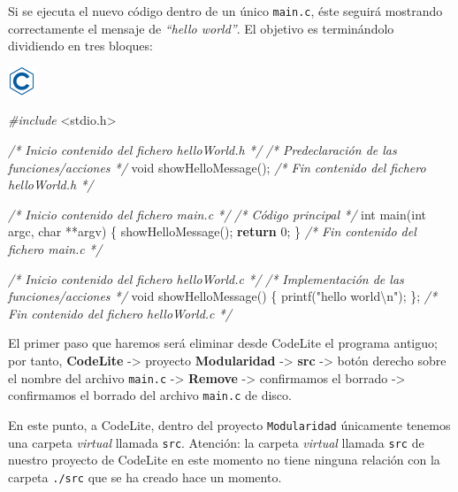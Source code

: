\documentclass[
]{book}
\newenvironment{Shaded}{\begin{snugshade}}{\end{snugshade}}
\newcommand{\CommentTok}[1]{\textcolor[rgb]{0.56,0.35,0.01}{\textit{#1}}}
\newcommand{\ControlFlowTok}[1]{\textcolor[rgb]{0.13,0.29,0.53}{\textbf{#1}}}
\newcommand{\DataTypeTok}[1]{\textcolor[rgb]{0.13,0.29,0.53}{#1}}
\newcommand{\DecValTok}[1]{\textcolor[rgb]{0.00,0.00,0.81}{#1}}
\newcommand{\ImportTok}[1]{#1}
\newcommand{\NormalTok}[1]{#1}
\newcommand{\PreprocessorTok}[1]{\textcolor[rgb]{0.56,0.35,0.01}{\textit{#1}}}
\newcommand{\SpecialCharTok}[1]{\textcolor[rgb]{0.00,0.00,0.00}{#1}}
\newcommand{\StringTok}[1]{\textcolor[rgb]{0.31,0.60,0.02}{#1}}
\begin{document}
Si se ejecuta el nuevo código dentro de un único \texttt{main.c}, éste seguirá mostrando correctamente el mensaje de \emph{``hello world''}. El objetivo es terminándolo dividiendo en tres bloques:

\includegraphics{./img/c.png}

\begin{Shaded}
\begin{Highlighting}[]
\PreprocessorTok{\#include }\ImportTok{\textless{}stdio.h\textgreater{}}

\CommentTok{/* Inicio contenido del fichero helloWorld.h */}
\CommentTok{/* Predeclaración de las funciones/acciones */}
\DataTypeTok{void}\NormalTok{ showHelloMessage();}
\CommentTok{/* Fin contenido del fichero helloWorld.h */}

\CommentTok{/* Inicio contenido del fichero main.c */}
\CommentTok{/* Código principal */}
\DataTypeTok{int}\NormalTok{ main(}\DataTypeTok{int}\NormalTok{ argc, }\DataTypeTok{char}\NormalTok{ **argv) \{}
\NormalTok{    showHelloMessage();}
    \ControlFlowTok{return} \DecValTok{0}\NormalTok{;}
\NormalTok{\}}
\CommentTok{/* Fin contenido del fichero main.c */}

\CommentTok{/* Inicio contenido del fichero helloWorld.c */}
\CommentTok{/* Implementación de las funciones/acciones */}
\DataTypeTok{void}\NormalTok{ showHelloMessage() \{}
\NormalTok{    printf(}\StringTok{"hello world}\SpecialCharTok{\textbackslash{}n}\StringTok{"}\NormalTok{);}
\NormalTok{\};}
\CommentTok{/* Fin contenido del fichero helloWorld.c */}
\end{Highlighting}
\end{Shaded}

El primer paso que haremos será eliminar desde CodeLite el programa antiguo; por tanto, \textbf{CodeLite} -\textgreater{} proyecto \textbf{Modularidad} -\textgreater{} \textbf{src} -\textgreater{} botón derecho sobre el nombre del archivo \texttt{main.c} -\textgreater{} \textbf{Remove} -\textgreater{} confirmamos el borrado -\textgreater{} confirmamos el borrado del archivo \texttt{main.c} de disco.

En este punto, a CodeLite, dentro del proyecto \texttt{Modularidad} únicamente tenemos una carpeta \emph{virtual} llamada \texttt{src}. Atención: la carpeta \emph{virtual} llamada \texttt{src} de nuestro proyecto de CodeLite en este momento no tiene ninguna relación con la carpeta \texttt{./src} que se ha creado hace un momento.
\end{document}
